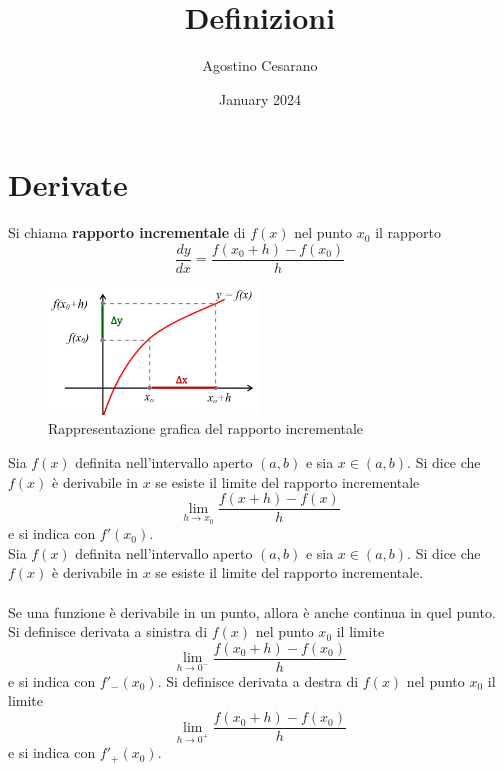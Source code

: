 \documentclass{article}
\title{Definizioni}
\author{Agostino Cesarano}
\date{January 2024}
\begin{document}
\maketitle
\setcounter{part}{3}
\part{Derivate}
Si chiama \textbf{rapporto incrementale} di $f(x)$ nel punto $x_0$ il rapporto
\begin{equation*}
    \frac{dy}{dx} = \frac{f(x_0 + h) - f(x_0)}{h}
\end{equation*}
\begin{figure}[h]
    \centering
    \includegraphics[width=0.5\textwidth]{rappincr.png}
    \caption{Rappresentazione grafica del rapporto incrementale}
\end{figure}
Sia $f(x)$ definita nell'intervallo aperto $(a,b)$ e sia $x \in (a,b)$. Si dice
che $f(x)$ è derivabile in $x$ se esiste il limite del rapporto incrementale
\begin{equation*}
    \lim_{h \to x_0} \frac{f(x+h)-f(x)}{h}
\end{equation*}
e si indica con $f'(x_0)$.\\
Sia $f(x)$ definita nell'intervallo aperto $(a,b)$ e sia $x \in (a,b)$. Si dice
che $f(x)$ è derivabile in $x$ se esiste il limite del rapporto incrementale.\\\\
Se una funzione è derivabile in un punto, allora è anche continua in quel punto.
\newpage
Si definisce derivata a sinistra di $f(x)$ nel punto $x_0$ il limite
\begin{equation*}
    \lim_{h \to 0^-} \frac{f(x_0+h)-f(x_0)}{h}
\end{equation*}
e si indica con $f'_-(x_0)$.
Si definisce derivata a destra di $f(x)$ nel punto $x_0$ il limite
\begin{equation*}
    \lim_{h \to 0^+} \frac{f(x_0+h)-f(x_0)}{h}
\end{equation*}
e si indica con $f'_+(x_0)$.\\\\
\end{document}
